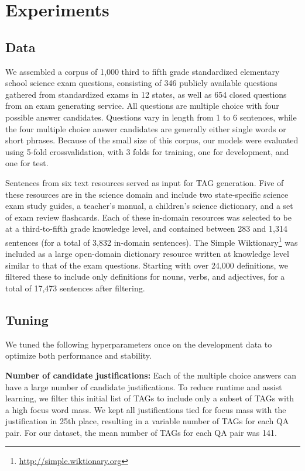 \section{Experiments}
\label{sec:experiments}

\subsection{Data}
\label{sec:data}


{} We assembled a corpus of 1,000 third to fifth grade standardized elementary school science exam questions, consisting of 346 publicly available questions gathered from standardized exams in 12 states, as well as 654 closed questions from an exam generating service. 
All questions are multiple choice with four possible answer candidates. Questions vary in length from 1 to 6 sentences, while the four multiple choice answer candidates are generally either single words or short phrases. 
Because of the small size of this corpus, our models were evaluated using 5-fold crossvalidation, with 3 folds for training, one for development, and one for test. 

{} Sentences from six text resources served as input for TAG generation.  Five of these resources are in the science domain and include two state-specific science exam study guides, a teacher's manual, a children's science dictionary, and a set of exam review flashcards.  Each of these in-domain resources was selected to be at a third-to-fifth grade knowledge level, and contained between 283 and 1,314 sentences (for a total of 3,832 in-domain sentences).  
The Simple Wiktionary\footnote{\url{http://simple.wiktionary.org}} was included as a large open-domain dictionary resource written at knowledge level similar to that of the exam questions.  Starting with over 24,000 definitions, we filtered these to include only definitions for nouns, verbs, and adjectives, for a total of 17,473 sentences after filtering.

\subsection{Tuning}
\label{sec:tuning}
We tuned the following hyperparameters once on the development data to optimize both performance and stability.

{\flushleft \textbf{Number of candidate justifications:}} 
Each of the multiple choice answers can have a large number of candidate justifications.  To reduce runtime and assist learning, we filter this initial list of TAGs to include only a subset of TAGs with a high focus word mass. We kept all justifications tied for focus mass with the justification in 25th place, resulting in a variable number of TAGs for each QA pair.  For our dataset, the mean number of TAGs for each QA pair was 141. \\

